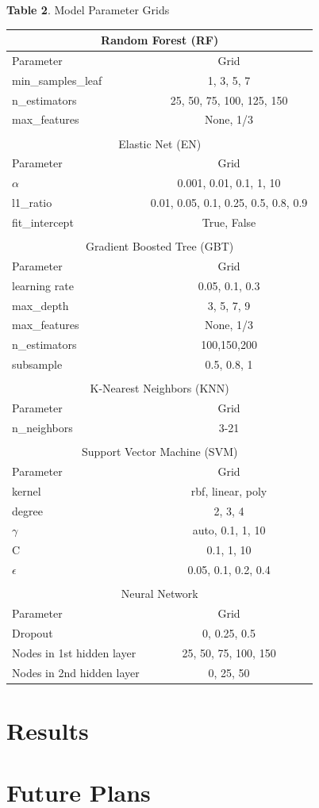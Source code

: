 \documentclass[12pt]{article}
\begin{document}
\begin{table}[ht]{\small \textbf{Table 2}. Model Parameter Grids} \\
\centering
\begin{tabular*}{.7\textwidth}{lc}
\hline\hline
\multicolumn{2}{c}{Random Forest (RF)} \\
\hline
Parameter & Grid \\
\hline
min\_samples\_leaf & 1, 3, 5, 7 \\
n\_estimators & 25, 50, 75, 100, 125, 150 \\
max\_features & None, 1/3  \\
\hline
\multicolumn{2}{c}{} \\
\multicolumn{2}{c}{Elastic Net (EN)} \\
\hline
Parameter & Grid \\
\hline
$\alpha$ & 0.001, 0.01, 0.1, 1, 10 \\
l1\_ratio & 0.01, 0.05, 0.1, 0.25, 0.5, 0.8, 0.9 \\
fit\_intercept & True, False \\
\hline
\multicolumn{2}{c}{} \\
\multicolumn{2}{c}{Gradient Boosted Tree (GBT)} \\
\hline
Parameter & Grid \\
\hline
learning rate & 0.05, 0.1, 0.3 \\
max\_depth & 3, 5, 7, 9 \\
max\_features & None, 1/3 \\
n\_estimators & 100,150,200 \\
subsample & 0.5, 0.8, 1 \\
\hline
\multicolumn{2}{c}{} \\
\multicolumn{2}{c}{K-Nearest Neighbors (KNN)} \\
\hline
Parameter & Grid \\
\hline
n\_neighbors & 3-21 \\
\hline
\multicolumn{2}{c}{} \\
\multicolumn{2}{c}{Support Vector Machine (SVM)} \\
\hline
Parameter & Grid \\
\hline
kernel & rbf, linear, poly \\
degree & 2, 3, 4 \\
$\gamma$ & auto, 0.1, 1, 10 \\
C & 0.1, 1, 10 \\
$\epsilon$ & 0.05, 0.1, 0.2, 0.4 \\
\hline
\multicolumn{2}{c}{} \\
\multicolumn{2}{c}{Neural Network} \\
\hline
Parameter & Grid \\
\hline
Dropout & 0, 0.25, 0.5 \\
Nodes in 1st hidden layer & 25, 50, 75, 100, 150 \\
Nodes in 2nd hidden layer & 0, 25, 50 \\
\hline
\end{tabular*}
\end{table}


\section{Results}


\section{Future Plans}
\end{document}
